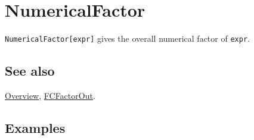 \documentclass[../FeynCalcManual.tex]{subfiles}
\begin{document}
\hypertarget{numericalfactor}{%
\section{NumericalFactor}\label{numericalfactor}}

\texttt{NumericalFactor[\allowbreak{}expr]} gives the overall numerical
factor of \texttt{expr}.

\subsection{See also}

\hyperlink{toc}{Overview}, \hyperlink{fcfactorout}{FCFactorOut}.

\subsection{Examples}
\end{document}
